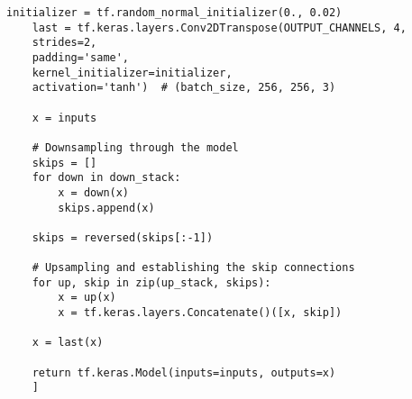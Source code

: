 \newpage
\begin{lstlisting}[language=pyhaff, caption={Skip Verbindungen}, label={cod:Pix2PixGAN Generator}]
	initializer = tf.random_normal_initializer(0., 0.02)
	last = tf.keras.layers.Conv2DTranspose(OUTPUT_CHANNELS, 4,
	strides=2,
	padding='same',
	kernel_initializer=initializer,
	activation='tanh')  # (batch_size, 256, 256, 3)
	
	x = inputs
	
	# Downsampling through the model
	skips = []
	for down in down_stack:
		x = down(x)
		skips.append(x)
	
	skips = reversed(skips[:-1])
	
	# Upsampling and establishing the skip connections
	for up, skip in zip(up_stack, skips):
		x = up(x)
		x = tf.keras.layers.Concatenate()([x, skip])
	
	x = last(x)
	
	return tf.keras.Model(inputs=inputs, outputs=x)
	]
\end{lstlisting}

